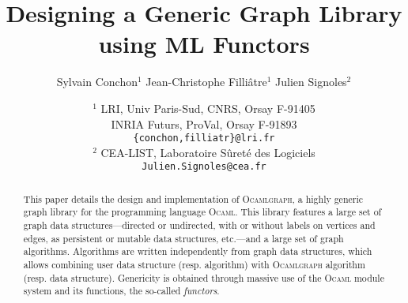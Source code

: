 \documentclass[12pt]{article}
\begin{document}
\title{\bf Designing a Generic Graph Library \\ using ML Functors}

\author
    {Sylvain Conchon$^1$ \quad
     Jean-Christophe Filli\^atre$^1$ \quad
     Julien Signoles$^2$}

\date{$^1$ LRI, Univ Paris-Sud, CNRS, Orsay F-91405\\
INRIA Futurs, ProVal, Orsay F-91893\\
  \texttt{\{conchon,filliatr\}@lri.fr} \\[0.5em]
  $^2$ CEA-LIST, Laboratoire S\^uret\'e des Logiciels \\
  \texttt{Julien.Signoles@cea.fr}}

\maketitle
\thispagestyle{empty}

\begin{abstract}
  This paper details the design and implementation of \textsc{Ocamlgraph}, a
  highly generic graph library for the programming language \textsc{Ocaml}.
  This library features a large set of graph data
  structures---directed or undirected, with or without labels on
  vertices and edges, as persistent or mutable data structures,
  etc.---and a large set of graph algorithms.  Algorithms are written
  independently from graph data structures, which allows combining
  user data structure (resp. algorithm) with \textsc{Ocamlgraph} algorithm
  (resp. data structure).  Genericity is obtained through massive use
  of the \textsc{Ocaml} module system and its functions, the so-called
  \emph{functors}.
\end{abstract}
\end{document}
